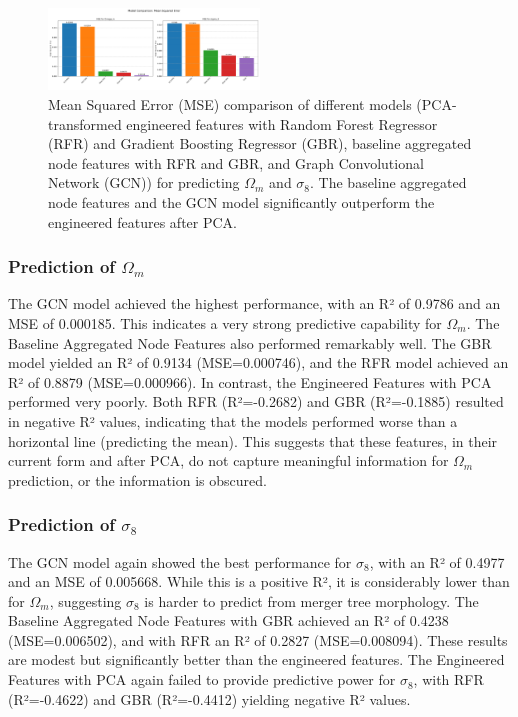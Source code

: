 \documentclass[twocolumn]{aastex631}
\begin{document}
\begin{figure}[h!]
    \centering
    \includegraphics[width=0.5\textwidth]{../input_files/plots/model_performance_mse_12_20250527-135752.png}
    \caption{Mean Squared Error (MSE) comparison of different models (PCA-transformed engineered features with Random Forest Regressor (RFR) and Gradient Boosting Regressor (GBR), baseline aggregated node features with RFR and GBR, and Graph Convolutional Network (GCN)) for predicting $\Omega_m$ and $\sigma_8$. The baseline aggregated node features and the GCN model significantly outperform the engineered features after PCA.}
    \label{fig:model_performance_mse}
\end{figure}

\subsubsection{Prediction of $\Omega_m$}
The GCN model achieved the highest performance, with an R² of 0.9786 and an MSE of 0.000185. This indicates a very strong predictive capability for $\Omega_m$. The Baseline Aggregated Node Features also performed remarkably well. The GBR model yielded an R² of 0.9134 (MSE=0.000746), and the RFR model achieved an R² of 0.8879 (MSE=0.000966). In contrast, the Engineered Features with PCA performed very poorly. Both RFR (R²=-0.2682) and GBR (R²=-0.1885) resulted in negative R² values, indicating that the models performed worse than a horizontal line (predicting the mean). This suggests that these features, in their current form and after PCA, do not capture meaningful information for $\Omega_m$ prediction, or the information is obscured.

\subsubsection{Prediction of $\sigma_8$}
The GCN model again showed the best performance for $\sigma_8$, with an R² of 0.4977 and an MSE of 0.005668. While this is a positive R², it is considerably lower than for $\Omega_m$, suggesting $\sigma_8$ is harder to predict from merger tree morphology. The Baseline Aggregated Node Features with GBR achieved an R² of 0.4238 (MSE=0.006502), and with RFR an R² of 0.2827 (MSE=0.008094). These results are modest but significantly better than the engineered features. The Engineered Features with PCA again failed to provide predictive power for $\sigma_8$, with RFR (R²=-0.4622) and GBR (R²=-0.4412) yielding negative R² values.
\end{document}

